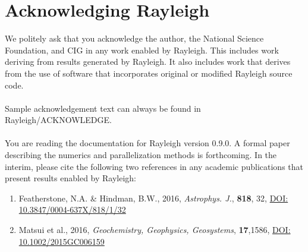 \documentclass[10pt, letterpaper]{article}
\begin{document}
\tableofcontents

















\section{Acknowledging Rayleigh}
We politely ask that you acknowledge the author, the National Science Foundation, and CIG in any work enabled by Rayleigh.  This includes work deriving from results generated by Rayleigh.  It also includes work that derives from the use of software that incorporates original or modified Rayleigh source code.
\\
\\
Sample acknowledgement text can always be found in Rayleigh/ACKNOWLEDGE.
\\
\\
\noindent You are reading the documentation for Rayleigh version 0.9.0.   A formal paper describing the numerics and parallelization methods is forthcoming.  In the interim, please cite the following two references in any academic publications that present results enabled by Rayleigh:
\begin{enumerate}
\item Featherstone, N.A. \& Hindman, B.W., 2016, \textit{Astrophys. J.}, \textbf{818}, 32, {\color{blue} \href{http://dx.doi.org/10.3847/0004-637X/818/1/32}{DOI: 10.3847/0004-637X/818/1/32}}
\item Matsui et al., 2016, \textit{Geochemistry, Geophysics, Geosystems}, \textbf{17},1586,  {\color{blue} \href{http://dx.doi.org/10.1002/2015GC006159}{DOI: 10.1002/2015GC006159}}
\end{enumerate}
\end{document}

